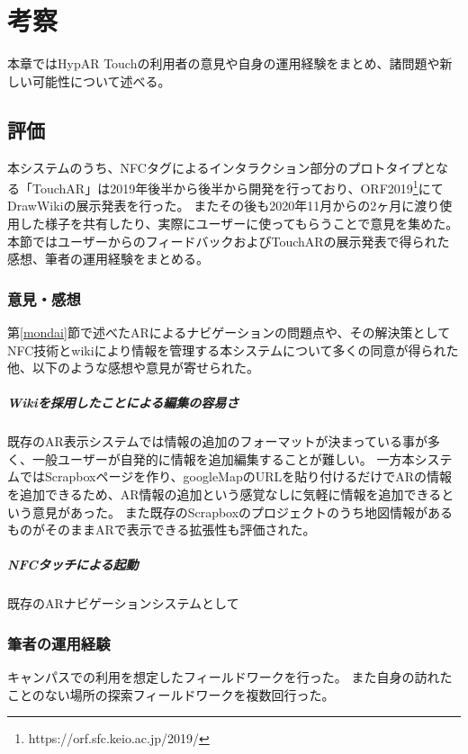 \chapter{考察}
\label{chap:consideration}

本章ではHypAR Touchの利用者の意見や自身の運用経験をまとめ、諸問題や新しい可能性について述べる。

\newpage


\section{評価}
本システムのうち、NFCタグによるインタラクション部分のプロトタイプとなる「TouchAR」は2019年後半から後半から開発を行っており、ORF2019\footnote{ \textsf{https://orf.sfc.keio.ac.jp/2019/} }にてDrawWikiの展示発表を行った。
またその後も2020年11月からの2ヶ月に渡り使用した様子を共有したり、実際にユーザーに使ってもらうことで意見を集めた。
本節ではユーザーからのフィードバックおよびTouchARの展示発表で得られた感想、筆者の運用経験をまとめる。

\subsection{意見・感想}

第\ref{mondai}節で述べたARによるナビゲーションの問題点や、その解決策としてNFC技術とwikiにより情報を管理する本システムについて多くの同意が得られた他、以下のような感想や意見が寄せられた。

\paragraph*{Wikiを採用したことによる編集の容易さ}
既存のAR表示システムでは情報の追加のフォーマットが決まっている事が多く、一般ユーザーが自発的に情報を追加編集することが難しい。
一方本システムではScrapboxページを作り、googleMapのURLを貼り付けるだけでARの情報を追加できるため、AR情報の追加という感覚なしに気軽に情報を追加できるという意見があった。
また既存のScrapboxのプロジェクトのうち地図情報があるものがそのままARで表示できる拡張性も評価された。

\paragraph*{NFCタッチによる起動}
既存のARナビゲーションシステムとして

\subsection{筆者の運用経験}
キャンパスでの利用を想定したフィールドワークを行った。
また自身の訪れたことのない場所の探索フィールドワークを複数回行った。

